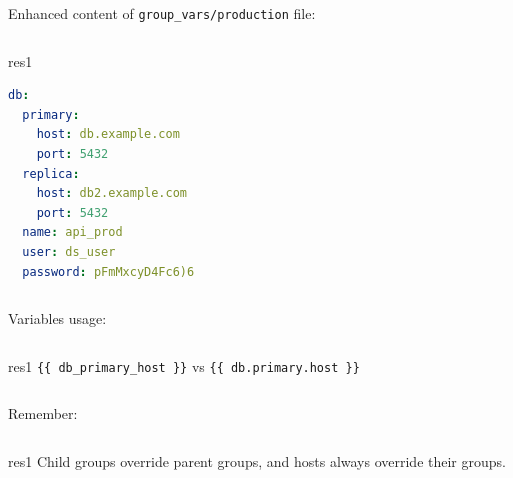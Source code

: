 \documentclass[pdf, 8pt, unicode, t]{beamer} %
\begin{document}
\begin{frame}[fragile]

Enhanced content of \verb|group_vars/production| file:\\
\vspace{1em}
\begin{columns}[t]
\begin{beamercolorbox}[dp=1ex,wd=\textwidth,sep=-0.5em,rounded=true,shadow=true,center]{res1}
\begin{lstlisting}[language=yaml]
db:
  primary:
    host: db.example.com
    port: 5432
  replica:
    host: db2.example.com
    port: 5432
  name: api_prod
  user: ds_user
  password: pFmMxcyD4Fc6)6
\end{lstlisting}
\end{beamercolorbox}
\end{columns}
\vspace{1em}

Variables usage:
\begin{columns}[t]
\begin{beamercolorbox}[dp=1ex,wd=\textwidth,sep=0.0em,rounded=true,shadow=true,center]{res1}
\verb|{{ db_primary_host }}| vs \verb|{{ db.primary.host }}|
\end{beamercolorbox}
\end{columns}
\vspace{2em}

Remember:
\vspace{1em}
\begin{columns}[t]
\begin{beamercolorbox}[dp=1ex,wd=\textwidth,sep=0.0em,rounded=true,shadow=true,center]{res1}
\alert{Child groups override parent groups, and hosts always override their groups.}
\end{beamercolorbox}
\end{columns}
\end{frame}
\end{document}

